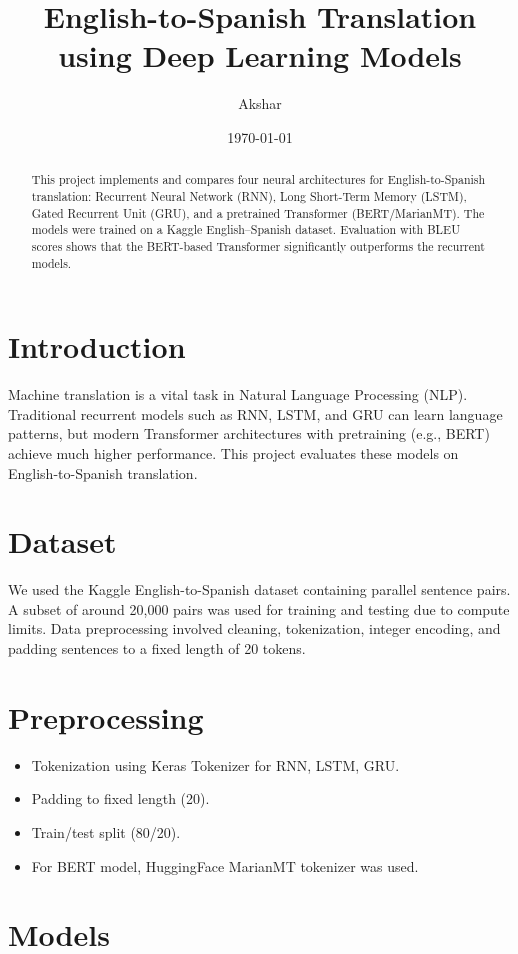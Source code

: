 \documentclass[12pt,a4paper]{article}
\title{English-to-Spanish Translation using Deep Learning Models}
\author{Akshar}
\date{\today}
\begin{document}
\maketitle

\begin{abstract}
This project implements and compares four neural architectures for English-to-Spanish translation: Recurrent Neural Network (RNN), Long Short-Term Memory (LSTM), Gated Recurrent Unit (GRU), and a pretrained Transformer (BERT/MarianMT). 
The models were trained on a Kaggle English–Spanish dataset. 
Evaluation with BLEU scores shows that the BERT-based Transformer significantly outperforms the recurrent models. 
\end{abstract}

\section{Introduction}
Machine translation is a vital task in Natural Language Processing (NLP). 
Traditional recurrent models such as RNN, LSTM, and GRU can learn language patterns, but modern Transformer architectures with pretraining (e.g., BERT) achieve much higher performance. 
This project evaluates these models on English-to-Spanish translation.

\section{Dataset}
We used the Kaggle English-to-Spanish dataset containing parallel sentence pairs. 
A subset of around 20,000 pairs was used for training and testing due to compute limits. 
Data preprocessing involved cleaning, tokenization, integer encoding, and padding sentences to a fixed length of 20 tokens.

\section{Preprocessing}
\begin{itemize}
    \item Tokenization using Keras Tokenizer for RNN, LSTM, GRU.
    \item Padding to fixed length (20).
    \item Train/test split (80/20).
    \item For BERT model, HuggingFace MarianMT tokenizer was used.
\end{itemize}

\section{Models}
\end{document}
